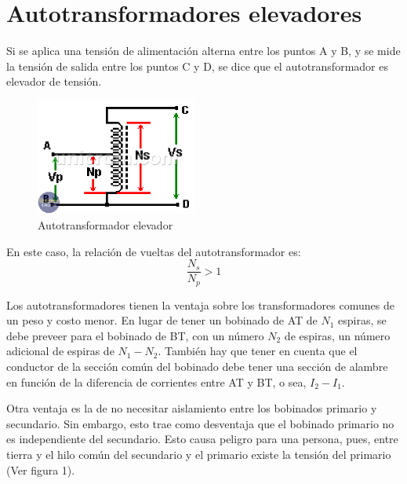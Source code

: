 \documentclass[11pt]{report}
\begin{document}
\section{Autotransformadores elevadores}
Si se aplica una tensión de alimentación alterna entre los puntos A y B, y se mide la tensión de salida entre los puntos C y D, se dice que el autotransformador es elevador de tensión.

\begin{figure}[h]
    \begin{center}
        \includegraphics[width=200px]{autotransformador-elevador.png}
    \end{center}
    \caption{Autotransformador elevador}
\end{figure}

En este caso, la relación de vueltas del autotransformador es: 
\begin{equation}
    \frac{N_s}{N_p} > 1
\end{equation}

Los autotransformadores tienen la ventaja sobre los transformadores comunes 
de un peso y costo menor. En lugar de tener un bobinado de AT de $N_1$ espiras,
se debe preveer para el bobinado de BT, con un número $N_2$ de espiras, un número 
adicional de espiras de $N_1-N_2$. También hay que tener en cuenta que el conductor
de la sección común del bobinado debe tener una sección de alambre en función de la 
diferencia de corrientes entre AT y BT, o sea, $I_2-I_1$.

Otra ventaja es la de no necesitar aislamiento entre los bobinados primario y secundario.
Sin embargo, esto trae como desventaja que el bobinado primario no es independiente del 
secundario. Esto causa peligro para una persona, pues, entre tierra y el hilo común del 
secundario y el primario existe la tensión del primario (Ver figura 1).
\end{document}
